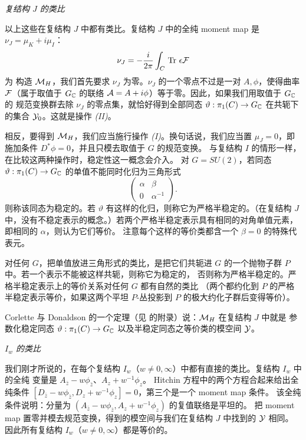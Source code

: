 \par\medskip\emph{复结构 $J$ 的类比}

以上这些在复结构 $J$ 中都有类比。复结构 $J$ 中的全纯 moment map 是 $\nu_J=\mu_K+i\mu_I$：
\setcounter{equation}{20}
\begin{equation}\label{eq:nuJ}
\nu_J =-{i\over 2\pi}\int_C\,\Tr\,\epsilon{\cal F}
\end{equation}
 为
构造 $\MH$，我们首先要求 $\nu_J$ 为零。$\nu_J$ 的一个零点不过是一对 $A,\phi$，使得曲率
${\cal F}$（属于取值于 $G_{\Bbb{C}}$ 的联络 $\CA=A+i\phi$）等于零。因此，如果我们用取值于 $G_{\Bbb{C}}$ 的
规范变换群去除 $\nu_J$ 的零点集，就恰好得到全部同态 $\vartheta:\pi_1(C)\to G_{\Bbb{C}}$ 在共轭下的集合 ${\cal Y}_0$。这就是操作 \emph{(II)}。

相反，要得到 $\MH$，我们应当施行操作 \emph{(I)}。换句话说，我们应当置 $\mu_J=0$，即施加条件 $D^*\phi=0$，并且只模去取值于 $G$ 的规范变换。
与复结构 $I$ 的情形一样，在比较这两种操作时，稳定性这一概念会介入。
对 $G=SU(2)$，若同态 $\vartheta:\pi_1(C)\to G_{\Bbb{C}}$ 的单值不能同时化归为三角形式 %
\setcounter{equation}{21}
\begin{equation}\label{eq:yto}
\left(\begin{matrix} \alpha &
\beta \\ 0 & \alpha^{-1}\end{matrix}\right).
\end{equation}
   则称该同态为稳定的。若 $\vartheta$ 有这样的化归，则称它为严格半稳定的。（在复结构
$J$ 中，没有不稳定表示的概念。）若两个严格半稳定表示具有相同的对角单值元素，即相同的 $\alpha$，则认为它们等价。
注意每个这样的等价类都含一个 $\beta=0$ 的特殊代表元。

对任何 $G$，把单值放进三角形式的类比，是把它们共轭进 $G$ 的一个抛物子群 $P$ 中。若一个表示不能被这样共轭，则称它为稳定的，
否则称为严格半稳定的。严格半稳定表示上的等价关系对任何 $G$ 都有自然的类比
（两个都约化到 $P$ 的严格半稳定表示等价，如果这两个平坦 $P$-丛投影到 $P$ 的极大约化子群后变得等价）。

Corlette \cite{ref58} 与 Donaldson 的一个定理（见 \cite{ref20} 的附录）说：$\MH$ 在复结构 $J$ 中就是
参数化稳定同态 $\vartheta:\pi_1(C)\to G_{\Bbb{C}}$ 以及半稳定同态之等价类的模空间 ${{\cal Y}}$。

\par\medskip\emph{$I_w$ 的类比}

我们刚才所说的，在每个复结构 $I_w$（$w\not= 0,\infty$）中都有直接的类比。复结构 $I_w$ 中的全纯
变量是 $A_{\bar z}-w\phi_{\bar z}$、$A_z+w^{-1}\phi_z$。
Hitchin 方程中的两个方程合起来给出全纯条件 $[D_{\bar z}-w\phi_{\bar
z},D_z+w^{-1}\phi_z]=0$，第三个是一个 moment map 条件。
该全纯条件说明：分量为 $(A_{\bar z}-w\phi_{\bar z},A_z+w^{-1}\phi_z)$ 的复值联络是平坦的。
把 moment map 置零并模去规范变换，得到的模空间与我们在复结构 $J$ 中找到的 ${{\cal Y}}$ 相同。
因此所有复结构 $I_w$（$w\not=0,\infty$）都是等价的。

